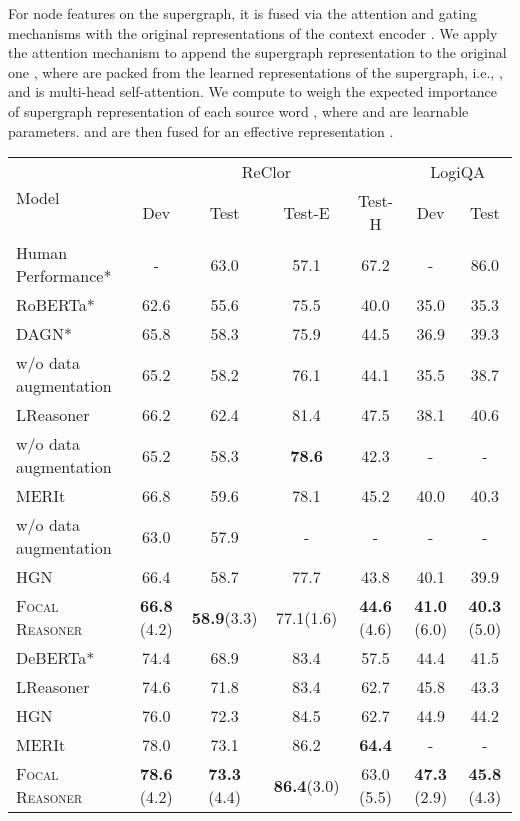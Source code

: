 \documentclass[11pt]{article}
\begin{document}
For node features on the supergraph, it is fused via the attention and gating mechanisms with the original representations of the context encoder . We apply the attention mechanism to append the supergraph representation to the original one ,
where  are packed from the learned representations of the supergraph, i.e., , and  is multi-head self-attention. We compute  to weigh the expected importance of supergraph representation of each source word ,
where  and  are learnable parameters.  and  are then fused for an effective representation .


\begin{table*}[htb]
\vspace{-3mm}
\small
\centering\centering\setlength{\tabcolsep}{9.5pt}
\begin{tabular}{lcccccc}
\toprule
\multirow{2}{*}{Model} &
\multicolumn{4}{c}{ReClor} & \multicolumn{2}{c}{LogiQA}\\
\cmidrule{2-5}
\cmidrule{6-7}
 & Dev & Test & Test-E & Test-H & Dev & Test \\ 
\midrule
Human Performance*& - & 63.0 & 57.1 & 67.2  & -&86.0 \\
\midrule
RoBERTa*  &62.6&55.6&75.5&40.0 & 35.0&35.3  \\
DAGN*  &65.8&58.3&75.9&44.5&36.9&39.3 \\
\quad w/o data augmentation &65.2&58.2&76.1&44.1 & 35.5&38.7\\
LReasoner & 66.2 & 62.4 &81.4 & 47.5 & 38.1 & 40.6 \\
\quad w/o data augmentation & 65.2 & 58.3 & \textbf{78.6} & 42.3 & - & - \\
MERIt & 66.8&59.6&78.1&45.2&40.0&40.3 \\
\quad w/o data augmentation & 63.0&57.9&-&-&-&- \\
HGN &66.4 & 58.7 & 77.7 & 43.8 & 40.1 & 39.9 \\
\textsc{Focal Reasoner}&\textbf{66.8} (4.2) &\textbf{58.9}(3.3) &77.1(1.6) & \textbf{44.6} (4.6) &\textbf{41.0} (6.0) &\textbf{40.3} (5.0)\\
\midrule
DeBERTa*  & 74.4 & 68.9 & 83.4 & 57.5 & 44.4 & 41.5 \\
LReasoner &74.6 & 71.8 & 83.4 & 62.7 & 45.8 & 43.3 \\
HGN &76.0 & 72.3 & 84.5 & 62.7 & 44.9 & 44.2 \\
MERIt &78.0&73.1&86.2&\textbf{64.4}&-&-\\
\textsc{Focal Reasoner}&\textbf{78.6} (4.2) & \textbf{73.3} (4.4)&\textbf{86.4}(3.0)&63.0 (5.5) & \textbf{47.3} (2.9)&\textbf{45.8} (4.3)\\



\end{tabular}
\end{table*}
\end{document}
